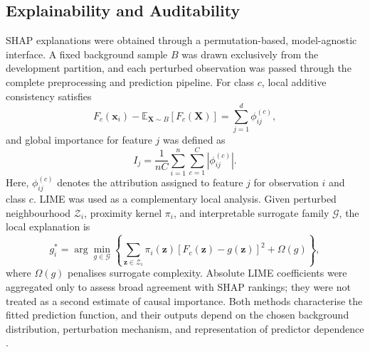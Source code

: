 \documentclass{elektr}
\begin{document}
\subsection{Explainability and Auditability}
SHAP explanations were obtained through a permutation-based, model-agnostic interface. A fixed background sample $B$ was drawn exclusively from the development partition, and each perturbed observation was passed through the complete preprocessing and prediction pipeline. For class $c$, local additive consistency satisfies
\begin{equation}
F_c(\mathbf{x}_i)-\mathbb{E}_{\mathbf{X}\sim B}[F_c(\mathbf{X})]
=\sum_{j=1}^{d}\phi_{ij}^{(c)},
\label{eq:shaplocal}
\end{equation}
and global importance for feature $j$ was defined as
\begin{equation}
I_j=\frac{1}{nC}\sum_{i=1}^{n}\sum_{c=1}^{C}|\phi_{ij}^{(c)}|.
\label{eq:shapglobal}
\end{equation}
Here, $\phi_{ij}^{(c)}$ denotes the attribution assigned to feature $j$ for observation $i$ and class $c$. LIME was used as a complementary local analysis. Given perturbed neighbourhood $\mathcal{Z}_i$, proximity kernel $\pi_i$, and interpretable surrogate family $\mathcal{G}$, the local explanation is
\begin{equation}
g_i^{*}=\arg\min_{g\in\mathcal{G}}
\left\{\sum_{\mathbf{z}\in\mathcal{Z}_i}\pi_i(\mathbf{z})
[F_c(\mathbf{z})-g(\mathbf{z})]^2+\Omega(g)\right\},
\label{eq:lime}
\end{equation}
where $\Omega(g)$ penalises surrogate complexity. Absolute LIME coefficients were aggregated only to assess broad agreement with SHAP rankings; they were not treated as a second estimate of causal importance. Both methods characterise the fitted prediction function, and their outputs depend on the chosen background distribution, perturbation mechanism, and representation of predictor dependence \cite{instanceshap2023,jung2023}.
\end{document}
